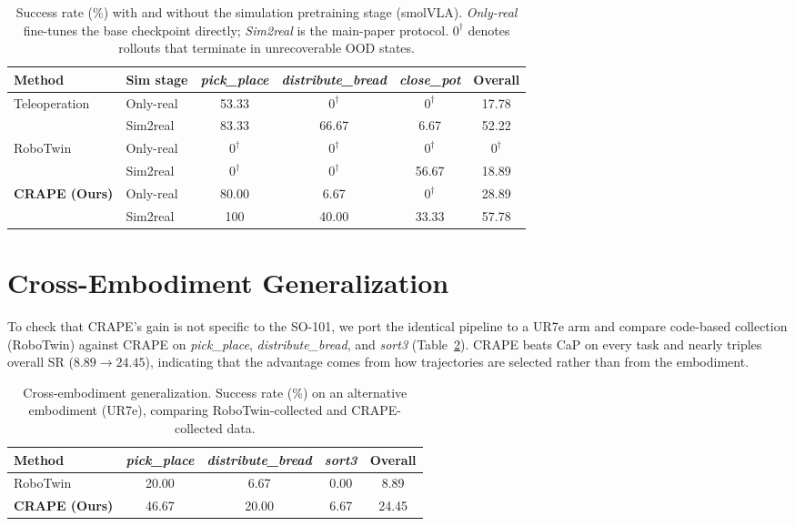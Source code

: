 \documentclass{article}
\begin{document}
\begin{table}[h]
\centering
\caption{Success rate (\%) with and without the simulation pretraining stage (smolVLA). \emph{Only-real} fine-tunes the base checkpoint directly; \emph{Sim2real} is the main-paper protocol. $0^{\dagger}$ denotes rollouts that terminate in unrecoverable OOD states.}
\label{tab:sim2real}
\small
\setlength{\tabcolsep}{6pt}
\begin{tabular}{llcccc}
\toprule
\textbf{Method} & \textbf{Sim stage} & \textit{pick\_place} & \textit{distribute\_bread} & \textit{close\_pot} & \textbf{Overall} \\
\midrule
\multirow{2}{*}{Teleoperation}
  & Only-real & 53.33 & $0^{\dagger}$ & $0^{\dagger}$ & 17.78 \\
  & Sim2real  & 83.33 & 66.67 & 6.67 & 52.22 \\
\midrule
\multirow{2}{*}{RoboTwin}
  & Only-real & $0^{\dagger}$ & $0^{\dagger}$ & $0^{\dagger}$ & $0^{\dagger}$ \\
  & Sim2real  & $0^{\dagger}$ & $0^{\dagger}$ & 56.67 & 18.89 \\
\midrule
\multirow{2}{*}{\textbf{CRAPE (Ours)}}
  & Only-real & 80.00 & 6.67 & $0^{\dagger}$ & 28.89 \\
  & Sim2real  & 100 & 40.00 & 33.33 & 57.78 \\
\bottomrule
\end{tabular}
\end{table}

\section{Cross-Embodiment Generalization}
\label{app:crossembod}

To check that CRAPE's gain is not specific to the SO-101, we port the identical
pipeline to a UR7e arm and compare code-based collection (RoboTwin) against CRAPE
on \textit{pick\_place}, \textit{distribute\_bread}, and \textit{sort3}
(Table~\ref{tab:crossembod}). CRAPE beats CaP on every task and nearly triples
overall SR ($8.89\!\to\!24.45$), indicating that the advantage comes from how
trajectories are selected rather than from the embodiment.

\begin{table}[h]
\centering
\caption{Cross-embodiment generalization. Success rate (\%) on an alternative embodiment (UR7e), comparing RoboTwin-collected and CRAPE-collected data.}
\label{tab:crossembod}
\small
\setlength{\tabcolsep}{6pt}
\begin{tabular}{lcccc}
\toprule
\textbf{Method} & \textit{pick\_place} & \textit{distribute\_bread} & \textit{sort3} & \textbf{Overall} \\
\midrule
RoboTwin & 20.00 & 6.67 & 0.00 & 8.89 \\
\textbf{CRAPE (Ours)} & 46.67 & 20.00 & 6.67 & 24.45 \\
\bottomrule
\end{tabular}
\end{table}
\end{document}

